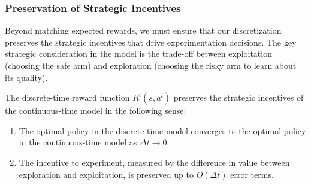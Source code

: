 \subsubsection{Preservation of Strategic Incentives}
\label{appendix:strategic_incentives}

Beyond matching expected rewards, we must ensure that our discretization preserves the strategic incentives that drive experimentation decisions. The key strategic consideration in the model is the trade-off between exploitation (choosing the safe arm) and exploration (choosing the risky arm to learn about its quality).

\begin{proposition}
The discrete-time reward function $R^i(s, a^i)$ preserves the strategic incentives of the continuous-time model in the following sense:
\begin{enumerate}
    \item The optimal policy in the discrete-time model converges to the optimal policy in the continuous-time model as $\Delta t \to 0$.
    \item The incentive to experiment, measured by the difference in value between exploration and exploitation, is preserved up to $O(\Delta t)$ error terms.
\end{enumerate}
\end{proposition}

